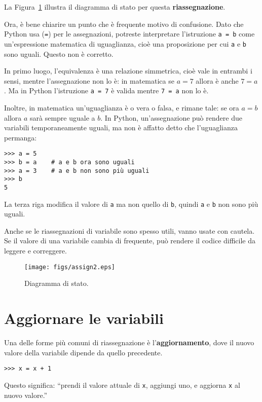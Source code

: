 \documentclass[10pt]{book}
\begin{document}
La Figura~\ref{fig.assign2} illustra il diagramma di stato per questa {\bf riassegnazione}. 

Ora, è bene chiarire un punto che è frequente motivo di confusione.
Dato che Python usa ({\tt =}) per le assegnazioni, potreste interpretare l'istruzione {\tt a = b} come un'espressione matematica di uguaglianza, cioè una proposizione per cui {\tt a} e {\tt b} sono uguali. Questo non è corretto.

In primo luogo, l'equivalenza è una relazione simmetrica, cioè vale in entrambi i sensi, mentre l'assegnazione non lo è: in matematica se $a=7$ allora è anche $7=a$. Ma in Python l'istruzione {\tt a = 7} è valida mentre {\tt 7 = a} non lo è.

Inoltre, in matematica un'uguaglianza è o vera o falsa, e rimane tale: se ora $a=b$ allora $a$ sarà sempre uguale a $b$.
In Python, un'assegnazione può rendere due variabili temporaneamente uguali, ma non è affatto detto che l'uguaglianza permanga:

\begin{verbatim}
>>> a = 5
>>> b = a    # a e b ora sono uguali
>>> a = 3    # a e b non sono più uguali
>>> b
5
\end{verbatim}
%
La terza riga modifica il valore di {\tt a} ma non quello di {\tt b}, quindi {\tt a} e {\tt b} non sono più uguali.

Anche se le riassegnazioni di variabile sono spesso utili, vanno usate con cautela. Se il valore di una variabile cambia di frequente, può rendere il codice difficile da leggere e correggere.

\begin{figure}
\centerline
{\texttt{[image: figs/assign2.eps]}}
\caption{Diagramma di stato.}
\label{fig.assign2}
\end{figure}



\section{Aggiornare le variabili}
\label{update}


Una delle forme più comuni di riassegnazione è l'{\bf aggiornamento},
dove il nuovo valore della variabile dipende da quello precedente.

\begin{verbatim}
>>> x = x + 1
\end{verbatim}
%
Questo significa: ``prendi il valore attuale di {\tt x}, aggiungi uno, e aggiorna {\tt x} al nuovo valore.''
\end{document}
